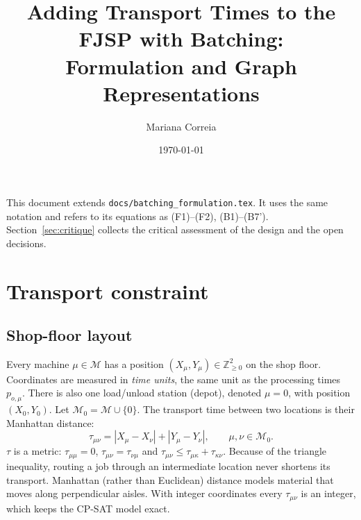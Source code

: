 \documentclass[11pt,a4paper]{article}
\title{Adding Transport Times to the FJSP with Batching:\\
Formulation and Graph Representations}
\author{Mariana Correia}
\date{\today}
\newcommand{\Mset}{\mathcal{M}}
\newcommand{\Z}{\mathbb{Z}}
\begin{document}
\maketitle

\noindent This document extends \texttt{docs/batching\_formulation.tex}. It
uses the same notation and refers to its equations as
(F1)--(F2), (B1)--(B7'). Section~\ref{sec:critique} collects the critical
assessment of the design and the open decisions.

\tableofcontents

\section{Transport constraint}
\label{sec:problem}

\subsection{Shop-floor layout}
Every machine $\mu\in\Mset$ has a position $(X_\mu,Y_\mu)\in\Z_{\ge0}^2$ on the
shop floor. Coordinates are measured in \emph{time units}, the same unit as the
processing times $p_{o,\mu}$. There is also one load/unload station (depot),
denoted $\mu=0$, with position $(X_0,Y_0)$. Let $\Mset_0=\Mset\cup\{0\}$.
The transport time between two locations is their Manhattan distance:
\begin{equation}
  \tau_{\mu\nu}=|X_\mu-X_\nu|+|Y_\mu-Y_\nu|,\qquad \mu,\nu\in\Mset_0 .
  \label{eq:tau}
\end{equation}
$\tau$ is a metric: $\tau_{\mu\mu}=0$, $\tau_{\mu\nu}=\tau_{\nu\mu}$ and
$\tau_{\mu\nu}\le\tau_{\mu\kappa}+\tau_{\kappa\nu}$. Because of the triangle
inequality, routing a job through an intermediate location never shortens its
transport. Manhattan (rather than Euclidean) distance models material that moves
along perpendicular aisles. With integer coordinates every $\tau_{\mu\nu}$ is an
integer, which keeps the CP-SAT model exact.
\end{document}
